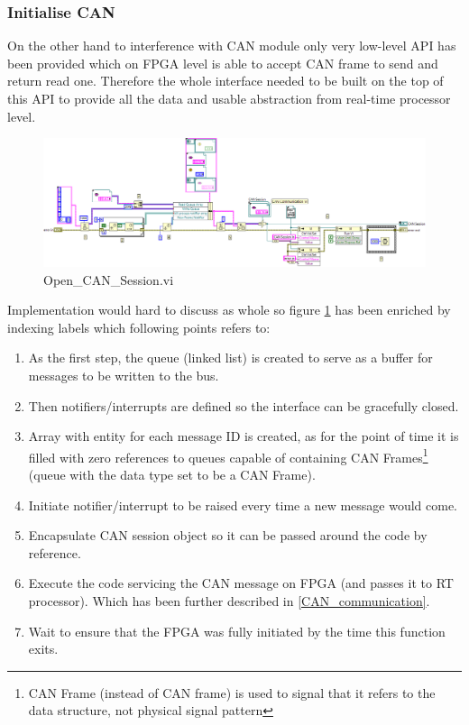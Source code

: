 \subsubsection{Initialise CAN}
On the other hand to interference with CAN module only very low-level API has been provided which on FPGA level is able to accept CAN frame to send and return read one. Therefore the whole interface needed to be built on the top of this API to provide all the data and usable abstraction from real-time processor level.
\begin{figure}[h]
    \centering
    \includegraphics[scale=\visc,max width=\textwidth]{figures/Open_CAN_Sessiond}
    \caption{Open\_CAN\_Session.vi}
    \label{vi:Open_CAN_Session}
\end{figure}
Implementation would hard to discuss as whole so figure \ref{vi:Open_CAN_Session} has been enriched by indexing labels which following points refers to:
\begin{enumerate}
    \item As the first step, the queue (linked list) is created to serve as a buffer for messages to be written to the bus.
    \item Then notifiers/interrupts are defined so the interface can be gracefully closed.
    \item Array with entity for each message ID is created, as for the point of time it is filled with zero references to queues capable of containing CAN Frames\footnote{CAN Frame (instead of CAN frame) is used to signal that it refers to the data structure, not physical signal pattern} (queue with the data type set to be a CAN Frame).
    \item Initiate notifier/interrupt to be raised every time a new message would come.
    \item Encapsulate CAN session object so it can be passed around the code by reference.
    \item Execute the code servicing the CAN message on FPGA (and passes it to RT processor). Which has been further described in \ref{CAN_communication}.
    \item Wait to ensure that the FPGA was fully initiated by the time this function exits.
\end{enumerate}

